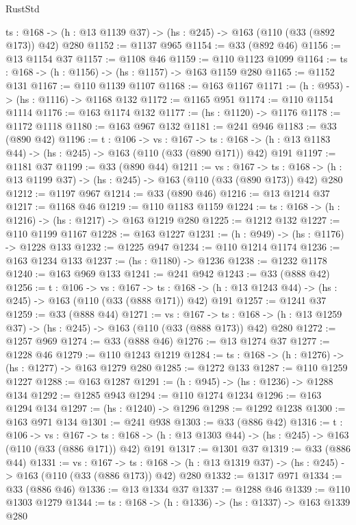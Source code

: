 \begin{lexlean}{RustStd}
\begin{coremodule}
  {ts : @168} -> (h : @13 @1139 @37) -> (hs : @245) -> @163 (@110 (@33 (@892 @173)) @42) @280
@1152 := @1137 @965
@1154 := @33 (@892 @46)
@1156 := @13 @1154 @37
@1157 := @1108 @46
@1159 := @110 @1123 @1099
@1164 := {ts : @168} -> (h : @1156) -> (hs : @1157) -> @163 @1159 @280
@1165 := @1152 @131
@1167 := @110 @1139 @1107
@1168 := @163 @1167
@1171 := (h : @953) -> (hs : @1116) -> @1168 @132
@1172 := @1165 @951
@1174 := @110 @1154 @1114
@1176 := @163 @1174 @132
@1177 := (hs : @1120) -> @1176
@1178 := @1172 @1118
@1180 := @163 @967 @132
@1181 := @241 @946
@1183 := @33 (@890 @42)
@1196 := {t : @106} ->
  {vs : @167} ->
  {ts : @168} -> (h : @13 @1183 @44) -> (hs : @245) -> @163 (@110 (@33 (@890 @171)) @42) @191
@1197 := @1181 @37
@1199 := @33 (@890 @44)
@1211 := {vs : @167} ->
  {ts : @168} -> (h : @13 @1199 @37) -> (hs : @245) -> @163 (@110 (@33 (@890 @173)) @42) @280
@1212 := @1197 @967
@1214 := @33 (@890 @46)
@1216 := @13 @1214 @37
@1217 := @1168 @46
@1219 := @110 @1183 @1159
@1224 := {ts : @168} -> (h : @1216) -> (hs : @1217) -> @163 @1219 @280
@1225 := @1212 @132
@1227 := @110 @1199 @1167
@1228 := @163 @1227
@1231 := (h : @949) -> (hs : @1176) -> @1228 @133
@1232 := @1225 @947
@1234 := @110 @1214 @1174
@1236 := @163 @1234 @133
@1237 := (hs : @1180) -> @1236
@1238 := @1232 @1178
@1240 := @163 @969 @133
@1241 := @241 @942
@1243 := @33 (@888 @42)
@1256 := {t : @106} ->
  {vs : @167} ->
  {ts : @168} -> (h : @13 @1243 @44) -> (hs : @245) -> @163 (@110 (@33 (@888 @171)) @42) @191
@1257 := @1241 @37
@1259 := @33 (@888 @44)
@1271 := {vs : @167} ->
  {ts : @168} -> (h : @13 @1259 @37) -> (hs : @245) -> @163 (@110 (@33 (@888 @173)) @42) @280
@1272 := @1257 @969
@1274 := @33 (@888 @46)
@1276 := @13 @1274 @37
@1277 := @1228 @46
@1279 := @110 @1243 @1219
@1284 := {ts : @168} -> (h : @1276) -> (hs : @1277) -> @163 @1279 @280
@1285 := @1272 @133
@1287 := @110 @1259 @1227
@1288 := @163 @1287
@1291 := (h : @945) -> (hs : @1236) -> @1288 @134
@1292 := @1285 @943
@1294 := @110 @1274 @1234
@1296 := @163 @1294 @134
@1297 := (hs : @1240) -> @1296
@1298 := @1292 @1238
@1300 := @163 @971 @134
@1301 := @241 @938
@1303 := @33 (@886 @42)
@1316 := {t : @106} ->
  {vs : @167} ->
  {ts : @168} -> (h : @13 @1303 @44) -> (hs : @245) -> @163 (@110 (@33 (@886 @171)) @42) @191
@1317 := @1301 @37
@1319 := @33 (@886 @44)
@1331 := {vs : @167} ->
  {ts : @168} -> (h : @13 @1319 @37) -> (hs : @245) -> @163 (@110 (@33 (@886 @173)) @42) @280
@1332 := @1317 @971
@1334 := @33 (@886 @46)
@1336 := @13 @1334 @37
@1337 := @1288 @46
@1339 := @110 @1303 @1279
@1344 := {ts : @168} -> (h : @1336) -> (hs : @1337) -> @163 @1339 @280

\end{coremodule}
\end{lexlean}
